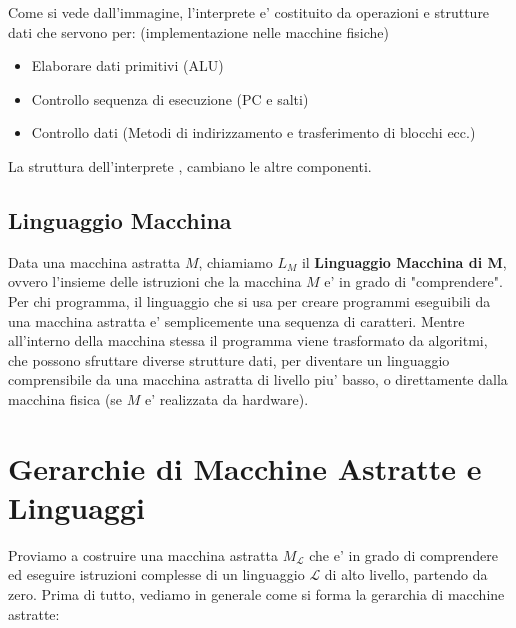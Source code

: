 Come si vede dall'immagine, l'interprete e' costituito da operazioni e strutture dati che servono per: (implementazione nelle macchine fisiche)
\begin{itemize}
  \item Elaborare dati primitivi (ALU)
  \item Controllo sequenza di esecuzione (PC e salti)
  \item Controllo dati (Metodi di indirizzamento e trasferimento di blocchi ecc.)
\end{itemize}

La struttura dell'interprete , cambiano le altre componenti.

\subsection{Linguaggio Macchina}
Data una macchina astratta $ M $, chiamiamo $ L_M $ il \textbf{Linguaggio Macchina di M}, ovvero l'insieme delle istruzioni che la macchina $ M $ e' in grado di "comprendere". Per chi programma, il linguaggio che si usa per creare programmi eseguibili da una macchina astratta e' semplicemente una sequenza di caratteri. Mentre all'interno della macchina stessa il programma viene trasformato da algoritmi, che possono sfruttare diverse strutture dati, per diventare un linguaggio comprensibile da una macchina astratta di livello piu' basso, o direttamente dalla macchina fisica (se $ M $ e' realizzata da hardware).

\section{Gerarchie di Macchine Astratte e Linguaggi}
Proviamo a costruire una macchina astratta $ M_\mathcal{L} $ che e' in grado di comprendere ed eseguire istruzioni complesse di un linguaggio $ \mathcal{L} $ di alto livello, partendo da zero. Prima di tutto, vediamo in generale come si forma la gerarchia di macchine astratte:

